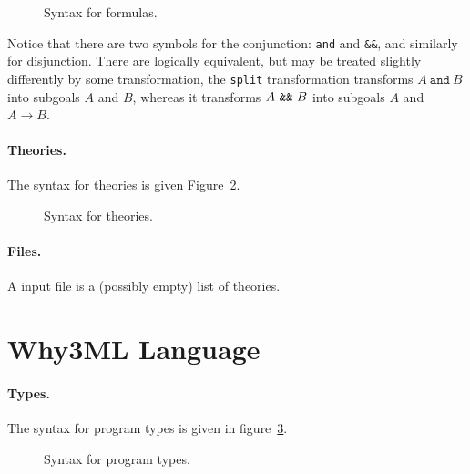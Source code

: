 \begin{figure}
  \begin{center}\framebox{}\end{center}
  \caption{Syntax for formulas.}
\label{fig:bnf:formula}
\end{figure}

Notice that there are two symbols for the conjunction: \texttt{and}
and \verb|&&|, and similarly for disjunction. There are logically
equivalent, but may be treated slightly differently by some
transformation, \eg{} the \texttt{split} transformation transforms
$A~\texttt{and}~B$ into subgoals $A$ and $B$, whereas it transforms
$A~\verb|&&|~B$ into subgoals $A$ and $A\rightarrow B$.

\paragraph{Theories.}
The syntax for theories is given Figure~\ref{fig:bnf:theory}.

\begin{figure}
  \begin{center}\framebox{}\end{center}
  \caption{Syntax for theories.}
\label{fig:bnf:theory}
\end{figure}

\paragraph{Files.}
A \why input file is a (possibly empty) list of theories.
\begin{center}\framebox{}\end{center}


\clearpage
\section{Why3ML Language}\label{sec:syntax:whyml}

\paragraph{Types.}
The syntax for program types is given in figure~\ref{fig:bnf:typev}.
\begin{figure}
  \begin{center}\framebox{}\end{center}
  \caption{Syntax for program types.}
\label{fig:bnf:typev}
\end{figure}

